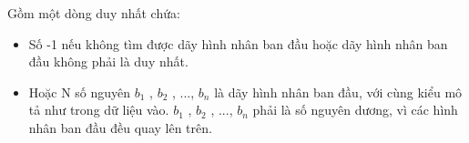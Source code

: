 Gồm một dòng duy nhất chứa:  
\begin{itemize}
	\item     Số -1 nếu không tìm được dãy hình nhân ban đầu hoặc dãy hình nhân ban đầu không phải là duy nhất.   
	\item     Hoặc N số nguyên $b_{1}$    , $b_{2}$    , ..., $b_{n}$    là dãy hình nhân ban đầu, với cùng kiểu mô tả như trong dữ liệu vào. $b_{1}$    , $b_{2}$    , ..., $b_{n}$    phải là số nguyên dương, vì các hình nhân ban đầu đều quay lên trên.   
\end{itemize}